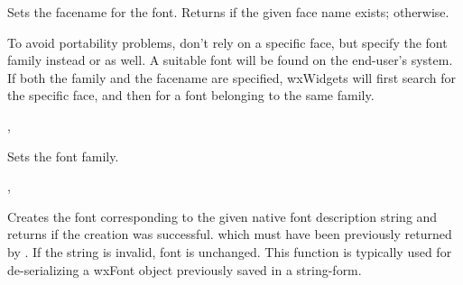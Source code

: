 
Sets the facename for the font.
Returns \true if the given face name exists; \false otherwise.




To avoid portability problems, don't rely on a specific face, but specify the font family
instead or as well. A suitable font will be found on the end-user's system. If both the
family and the facename are specified, wxWidgets will first search for the specific face,
and then for a font belonging to the same family.


, 


\label{wxfontsetfamily}


Sets the font family.




, 


\label{wxfontsetnativefontinfo}


Creates the font corresponding to the given native font description string and returns \true if
the creation was successful.
which must have been previously returned by
. If the string is
invalid, font is unchanged. This function is typically used for de-serializing a wxFont
object previously saved in a string-form.


